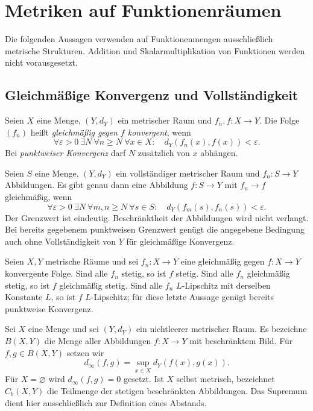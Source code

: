 \chapter{Metriken auf Funktionenräumen}
\label{b47guide:ch:function-spaces}

Die folgenden Aussagen verwenden auf Funktionenmengen ausschließlich
metrische Strukturen. Addition und Skalarmultiplikation von Funktionen
werden nicht vorausgesetzt.

\section{Gleichmäßige Konvergenz und Vollständigkeit}

\begin{definition}
\label{b47guide:def:uniform-convergence}
Seien $X$ eine Menge, $(Y,d_Y)$ ein metrischer Raum und
$f_n,f:X\to Y$. Die Folge $(f_n)$ heißt \emph{gleichmäßig gegen $f$
konvergent}, wenn
\[
 \forall\varepsilon>0\ \exists N\ \forall n\geq N\ \forall x\in X:
 \quad d_Y(f_n(x),f(x))<\varepsilon.
\]
Bei \emph{punktweiser Konvergenz} darf $N$ zusätzlich von $x$ abhängen.
\end{definition}

\begin{theorem}
\label{b47guide:thm:uniform-cauchy}
Seien $S$ eine Menge, $(Y,d_Y)$ ein vollständiger metrischer Raum und
$f_n:S\to Y$ Abbildungen. Es gibt genau dann eine Abbildung $f:S\to Y$
mit $f_n\to f$ gleichmäßig, wenn
\[
 \forall\varepsilon>0\ \exists N\ \forall m,n\geq N\ \forall s\in S:
 \quad d_Y(f_m(s),f_n(s))<\varepsilon.
\]
Der Grenzwert ist eindeutig. Beschränktheit der Abbildungen wird nicht
verlangt. Bei bereits gegebenem punktweisen Grenzwert genügt die
angegebene Bedingung auch ohne Vollständigkeit von $Y$ für gleichmäßige
Konvergenz. \cite{uniform-cauchy}
\end{theorem}
\begin{theorem}
\label{b47guide:thm:uniform-limits}
Seien $X,Y$ metrische Räume und sei $f_n:X\to Y$ eine gleichmäßig
gegen $f:X\to Y$ konvergente Folge.
Sind alle $f_n$ stetig, so ist $f$ stetig.
Sind alle $f_n$ gleichmäßig stetig, so ist $f$ gleichmäßig stetig.
Sind alle $f_n$ $L$-Lipschitz mit derselben Konstante $L$, so ist
$f$ $L$-Lipschitz; für diese letzte Aussage genügt bereits
punktweise Konvergenz.
\end{theorem}

\begin{definition}
\label{b47guide:def:sup-metric}
Sei $X$ eine Menge und sei $(Y,d_Y)$ ein nichtleerer metrischer Raum.
Es bezeichne $B(X,Y)$ die Menge aller Abbildungen $f:X\to Y$ mit
beschränktem Bild. Für $f,g\in B(X,Y)$ setzen wir
\[
 d_\infty(f,g)=\sup_{x\in X}d_Y(f(x),g(x)).
\]
Für $X=\varnothing$ wird $d_\infty(f,g)=0$ gesetzt.
Ist $X$ selbst metrisch, bezeichnet $C_b(X,Y)$ die Teilmenge der
stetigen beschränkten Abbildungen.
Das Supremum dient hier ausschließlich zur Definition eines Abstands.
\end{definition}

